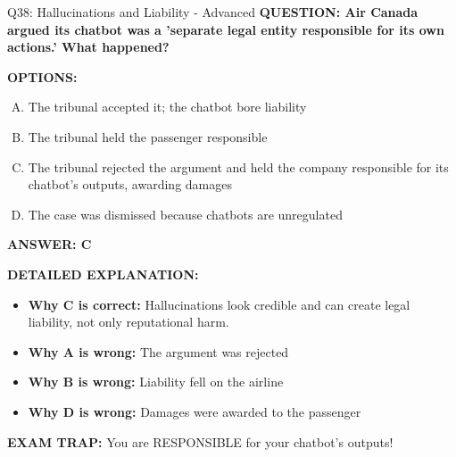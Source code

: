 \documentclass[8pt]{beamer}
\begin{document}
\begin{frame}[shrink=6]{Q38: Hallucinations and Liability - Advanced}
\fontsize{6.5}{7.5}\selectfont
\textbf{QUESTION: Air Canada argued its chatbot was a 'separate legal entity responsible for its own actions.' What happened?}

\vspace{0.1cm}
\textbf{OPTIONS:}
\begin{enumerate}[A.]
\item The tribunal accepted it; the chatbot bore liability
\item The tribunal held the passenger responsible
\item The tribunal rejected the argument and held the company responsible for its chatbot's outputs, awarding damages
\item The case was dismissed because chatbots are unregulated
\end{enumerate}

\vspace{0.1cm}
\textcolor{myblue}{\textbf{ANSWER: C}}

\vspace{0.1cm}
\textbf{DETAILED EXPLANATION:}
\begin{itemize}
\item \textbf{Why C is correct:} Hallucinations look credible and can create legal liability, not only reputational harm.
\item \textbf{Why A is wrong:} The argument was rejected
\item \textbf{Why B is wrong:} Liability fell on the airline
\item \textbf{Why D is wrong:} Damages were awarded to the passenger
\end{itemize}

\textcolor{myred}{\textbf{EXAM TRAP:}} You are RESPONSIBLE for your chatbot's outputs!
\end{frame}
\end{document}
